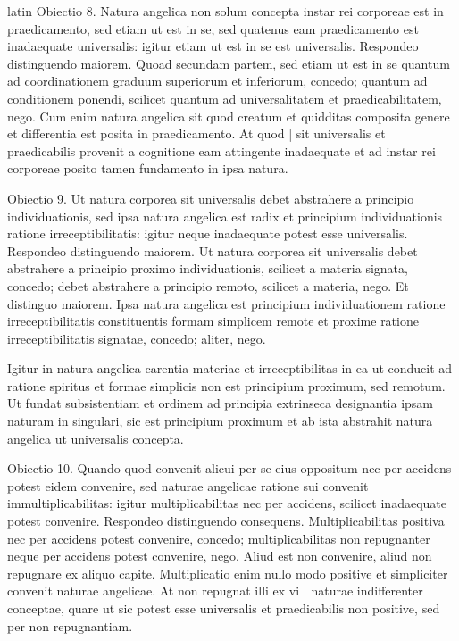 \begin{otherlanguage*}{latin}
\pstart
 Obiectio 8. Natura angelica non solum concepta instar rei corporeae est in praedicamento, sed etiam ut est in se, sed quatenus eam praedicamento est inadaequate universalis: igitur etiam ut est in se est universalis. Respondeo distinguendo maiorem. Quoad secundam partem, sed etiam ut est in se quantum ad coordinationem graduum superiorum et inferiorum, concedo; quantum ad conditionem ponendi, scilicet quantum ad universalitatem et praedicabilitatem, nego. Cum enim natura angelica sit quod creatum et quidditas composita genere et differentia est posita in praedicamento. At quod \textnormal{|} sit universalis et praedicabilis provenit a cognitione eam attingente inadaequate et ad instar rei corporeae posito tamen fundamento in ipsa natura. 
\pend

\pstart
 Obiectio 9. Ut natura corporea sit universalis debet abstrahere a principio individuationis, sed ipsa natura angelica est radix et principium individuationis ratione irreceptibilitatis: igitur neque inadaequate potest esse universalis. Respondeo distinguendo maiorem. Ut natura corporea sit universalis debet abstrahere a principio proximo individuationis, scilicet a materia signata, concedo; debet abstrahere a principio remoto, scilicet a materia, nego. Et distinguo maiorem. Ipsa natura angelica est principium individuationem ratione irreceptibilitatis constituentis formam simplicem remote et proxime ratione irreceptibilitatis signatae, concedo; aliter, nego. 
\pend

\pstart
 Igitur in natura angelica carentia materiae et irreceptibilitas in ea ut conducit ad ratione spiritus et formae simplicis non est principium proximum, sed remotum. Ut fundat subsistentiam et ordinem ad principia extrinseca designantia ipsam naturam in singulari, sic est principium proximum et ab ista abstrahit natura angelica ut universalis concepta. 
\pend

\pstart
 Obiectio 10. Quando quod convenit alicui per se eius oppositum nec per accidens potest eidem convenire, sed naturae angelicae ratione sui convenit immultiplicabilitas: igitur multiplicabilitas nec per accidens, scilicet inadaequate potest convenire. Respondeo distinguendo consequens. Multiplicabilitas positiva nec per accidens potest convenire, concedo; multiplicabilitas non repugnanter neque per accidens potest convenire, nego. Aliud est non convenire, aliud non repugnare ex aliquo capite. Multiplicatio enim nullo modo positive et simpliciter convenit naturae angelicae. At non repugnat illi ex vi \textnormal{|}   naturae indifferenter conceptae, quare ut sic potest esse universalis et praedicabilis non positive, sed per non repugnantiam. 
\pend


\end{otherlanguage*}
